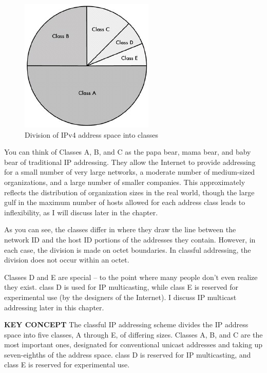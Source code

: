 \begin{figure}
   \centering
   \includegraphics[width=.5\textwidth]{images/ipv4-classes.jpg}
   \caption{Division of IPv4 address space into classes}
   \label{fig:ipv4-classes}
\end{figure}

You can think of Classes A, B, and C as the papa bear, mama bear, and baby bear of traditional IP addressing.
They allow the Internet to provide addressing for a small number of very
large networks, a moderate number of medium-sized organizations, and a
large number of smaller companies. This approximately reflects the
distribution of organization sizes in the real world, though the large
gulf in the maximum number of hosts allowed for each address class leads
to inflexibility, as I will discuss later in the chapter.

As you can see, the classes differ in where they draw the line between
the network ID and the host ID portions of the addresses they contain.
However, in each case, the division is made on octet boundaries. In
classful addressing, the division does not occur within an octet.

Classes D and E are special -- to the point where many people don't even realize they exist.
class D is used for IP multicasting, while class E is reserved for experimental use (by the designers of the Internet).
I discuss IP multicast addressing later in this chapter.


{\textbf{KEY CONCEPT}} The classful IP addressing scheme divides the IP
address space into five classes, A through E, of differing sizes.
Classes A, B, and C are the most important ones, designated for
conventional unicast addresses and taking up seven-eighths of the
address space. class D is reserved for IP multicasting, and class E is
reserved for experimental use.




